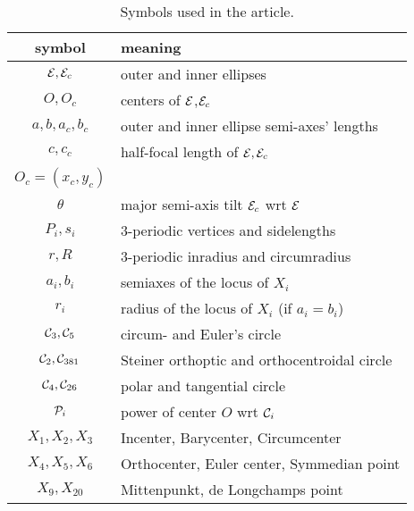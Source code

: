 \begin{table}[H]
\small
\begin{tabular}{|c|l|}
\hline
symbol & meaning \\
\hline
$\E,\E_c$ & outer and inner ellipses \\
$O,O_c$ & centers of $\E$,$\E_c$\\
$a,b,a_c,b_c$ & outer and inner ellipse semi-axes' lengths \\
$c,c_c$ & half-focal length of $\E,\E_c$ \\ 
 $O_c=(x_c,y_c)$\\
$\theta$ & major semi-axis tilt $\E_c$ wrt $\E$ \\
$P_i,s_i$ & 3-periodic vertices and sidelengths \\
$r,R$ & 3-periodic inradius and circumradius \\
$a_i,b_i$ & semiaxes of the locus of $X_i$ \\
$r_i$ & radius of the locus of $X_i$ (if $a_i=b_i$) \\
\hline
$\C_3,\C_5$ & circum- and Euler's circle \\
$\C_2,\C_{381}$ & Steiner orthoptic and orthocentroidal circle \\
$\C_4,\C_{26}$ & polar and tangential circle \\
$\P_i$ & power of center $O$ wrt $\C_i$ \\
\hline
$X_1,X_2,X_3$ & Incenter, Barycenter, Circumcenter \\
$X_4,X_5,X_6$ & Orthocenter, Euler center, Symmedian point \\
$X_9,X_{20}$ & Mittenpunkt, de Longchamps point\\
\hline
\end{tabular}
\caption{Symbols used in the article.}
\label{tab:symbols}
\end{table}